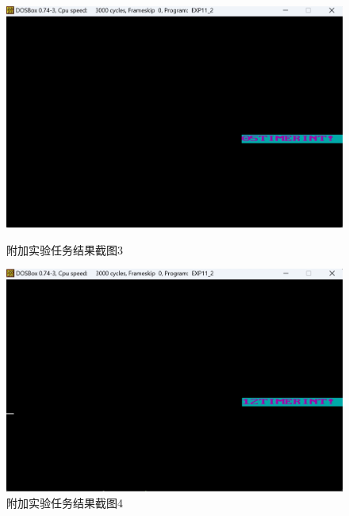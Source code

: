 \documentclass[12pt, a4paper, oneside]{ctexart}
\begin{document}
\begin{figure}[H]
    \centering
    \begin{minipage}{0.45\textwidth}
    \centering
    \includegraphics[scale=0.4]{pic/exp11-2-3.png}
    \caption{附加实验任务结果截图3}
    \label{附加实验任务结果截图3}
    \end{minipage}
    \hspace{0.05\textwidth}
    \begin{minipage}{0.45\textwidth}
    \centering
    \includegraphics[scale=0.4]{pic/exp11-2-4.png}
    \caption{附加实验任务结果截图4}
    \label{附加实验任务结果截图4}
    \end{minipage}
\end{figure}
\end{document}
